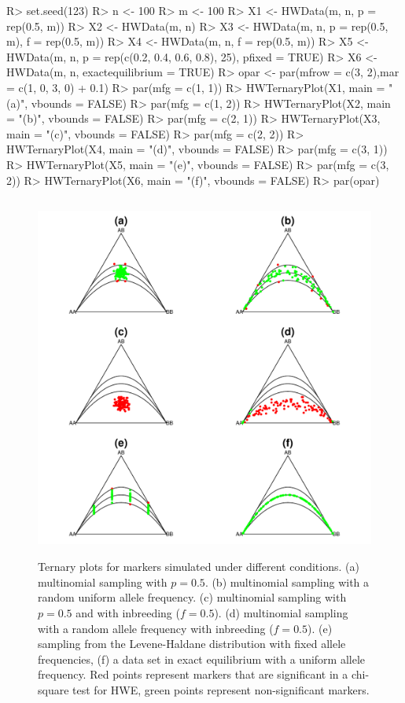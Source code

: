 \documentclass[nojss]{jss}
\begin{document}
\begin{Schunk}
\begin{Sinput}
R> set.seed(123)
R> n <- 100
R> m <- 100
R> X1 <- HWData(m, n, p = rep(0.5, m))
R> X2 <- HWData(m, n)
R> X3 <- HWData(m, n, p = rep(0.5, m), f = rep(0.5, m))
R> X4 <- HWData(m, n, f = rep(0.5, m))
R> X5 <- HWData(m, n, p = rep(c(0.2, 0.4, 0.6, 0.8), 25), pfixed = TRUE)
R> X6 <- HWData(m, n, exactequilibrium = TRUE)
R> opar <- par(mfrow = c(3, 2),mar = c(1, 0, 3, 0) + 0.1)
R> par(mfg = c(1, 1))
R> HWTernaryPlot(X1, main = "(a)", vbounds = FALSE)
R> par(mfg = c(1, 2))
R> HWTernaryPlot(X2, main = "(b)", vbounds = FALSE)
R> par(mfg = c(2, 1))
R> HWTernaryPlot(X3, main = "(c)", vbounds = FALSE)
R> par(mfg = c(2, 2))
R> HWTernaryPlot(X4, main = "(d)", vbounds = FALSE)
R> par(mfg = c(3, 1))
R> HWTernaryPlot(X5, main = "(e)", vbounds = FALSE)
R> par(mfg = c(3, 2))
R> HWTernaryPlot(X6, main = "(f)", vbounds = FALSE)
R> par(opar)
\end{Sinput}
\end{Schunk}

\begin{figure}
\begin{center}
\includegraphics[height=120mm, width=120mm]{Simulated2.pdf} 
\caption{Ternary plots for markers simulated under different conditions. (a) multinomial sampling with $p=0.5$. 
  (b) multinomial sampling with a random uniform allele frequency. (c) multinomial sampling with $p=0.5$ and 
  with inbreeding ($f=0.5$). (d) multinomial sampling with a random allele frequency with inbreeding ($f=0.5$).
  (e) sampling from the Levene-Haldane distribution with fixed allele frequencies, (f) a data set in exact equilibrium with a uniform allele frequency. Red points represent markers that are significant in a chi-square test for HWE, green points represent non-significant markers.}\label{fig:simulated2}
\end{center}
\end{figure}
\clearpage
\end{document}
